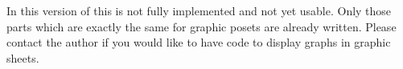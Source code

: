 
In this version of {\XGAP} this is not fully implemented and not yet
usable. Only those parts which are exactly the same for graphic posets are
already written. Please contact the author if you would like to have code
to display graphs in graphic sheets.

